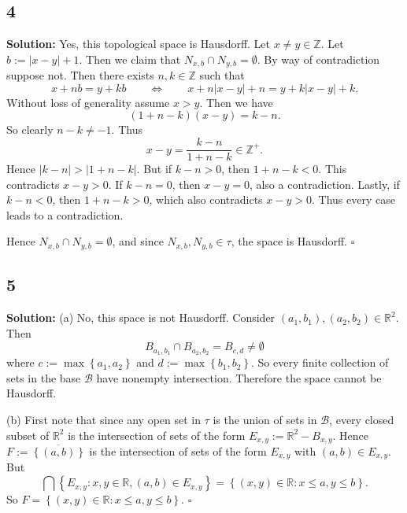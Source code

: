 \documentclass[12pt]{article}
\newcounter{ProofCounter}
\newenvironment{Solution}{\stepcounter{ProofCounter}\textbf{Solution:}}{\hfill$\square$}
\begin{document}
\newpage
\subsection*{4}
\begin{Solution}
  Yes, this topological space is Hausdorff. Let $x \neq y \in \mathbb{Z}$. Let $b := |x-y| + 1$. Then we claim that $N_{x,b} \cap N_{y,b} =
  \emptyset$. By way of contradiction suppose not. Then there exists $n,k \in \mathbb{Z}$ such that
  \[
    x + nb = y + kb \qquad \Leftrightarrow \qquad x + n|x-y| + n = y + k|x-y| + k.
  \]
  Without loss of generality assume $x > y$. Then we have 
  \[
    (1 + n-k)(x-y) = k - n.
  \]
  So clearly $n - k \neq -1$. Thus 
  \[
    x - y = \frac{k-n}{1 + n-k} \in \mathbb{Z}^+.
  \]
  Hence $|k-n| > |1 + n-k|$. But if $k - n > 0$, then $1 + n-k < 0$. This contradicts $x - y > 0$. If $k - n = 0$, then $x - y = 0$, also a
  contradiction. Lastly, if $k - n < 0$, then $1 + n - k > 0$, which also contradicts $x - y > 0$.
  Thus every case leads to a contradiction.

  Hence $N_{x,b} \cap N_{y,b} = \emptyset$, and since $N_{x,b}, N_{y,b} \in \tau$, the space is Hausdorff.
\end{Solution}


\subsection*{5}
\begin{Solution}
  (a) No, this space is not Hausdorff. Consider $(a_1, b_1), (a_2, b_2) \in \mathbb{R}^2$. Then 
  \[
    B_{a_1,b_1} \cap B_{a_2,b_2} = B_{c,d} \neq \emptyset
  \]
  where $c := \max\left\{ a_1,a_2 \right\}$ and $d := \max\left\{ b_1,b_2 \right\}$. So every finite collection of sets in the base $\mathcal{B}$ have
  nonempty intersection. Therefore the space cannot be Hausdorff.

  (b) First note that since any open set in $\tau$ is the union of sets in $\mathcal{B}$, every closed subset of $\mathbb{R}^2$ is the intersection of
  sets of the form $E_{x,y} := \mathbb{R}^2 - B_{x,y}$. Hence $F := \overline{\left\{ (a,b) \right\}}$ is the intersection of sets of the form
  $E_{x,y}$ with $(a,b) \in E_{x,y}$. But 
  \[
    \bigcap \left\{ E_{x,y} : x,y \in \mathbb{R}, (a,b) \in E_{x,y} \right\} = \left\{ (x,y) \in \mathbb{R} : x \leq a, y \leq b \right\}.
  \]
  So $F = \left\{ (x,y) \in \mathbb{R} : x \leq a, y \leq b \right\}$.
\end{Solution}
\end{document}
